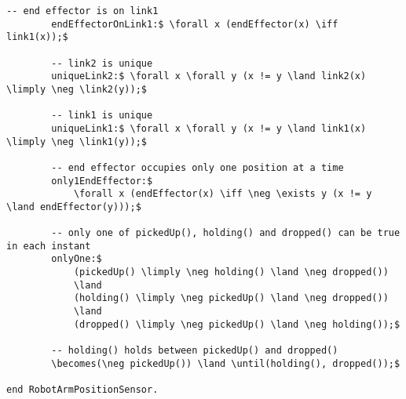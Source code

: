 \begin{lstlisting}[fontadjust, mathescape, frame=tlb]
        -- end effector is on link1
        endEffectorOnLink1:$ \forall x (endEffector(x) \iff link1(x));$

        -- link2 is unique
        uniqueLink2:$ \forall x \forall y (x != y \land link2(x) \limply \neg \link2(y));$

        -- link1 is unique
        uniqueLink1:$ \forall x \forall y (x != y \land link1(x) \limply \neg \link1(y));$

        -- end effector occupies only one position at a time
        only1EndEffector:$
            \forall x (endEffector(x) \iff \neg \exists y (x != y \land endEffector(y)));$

        -- only one of pickedUp(), holding() and dropped() can be true in each instant
        onlyOne:$
            (pickedUp() \limply \neg holding() \land \neg dropped())
            \land
            (holding() \limply \neg pickedUp() \land \neg dropped())
            \land
            (dropped() \limply \neg pickedUp() \land \neg holding());$

        -- holding() holds between pickedUp() and dropped()
        \becomes(\neg pickedUp()) \land \until(holding(), dropped());$

end RobotArmPositionSensor.\end{lstlisting}